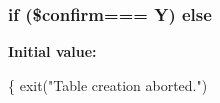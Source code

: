 \subsubsection[{\texorpdfstring{else}{else}}]{\setlength{\rightskip}{0pt plus 5cm}if (\$confirm=== \textquotesingle{}Y\textquotesingle{}) else}\hypertarget{table-generator_8php_a29dec57ce2935f1ff5bbb96ea50aec2d}{}\label{table-generator_8php_a29dec57ce2935f1ff5bbb96ea50aec2d}
{\bfseries Initial value\+:}
\begin{DoxyCode}
\{
    exit(\textcolor{stringliteral}{"Table creation aborted."})
\end{DoxyCode}
